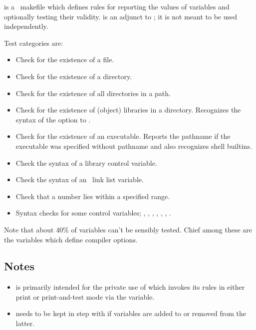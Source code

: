  is a \gnu\ makefile which defines rules for reporting the
values of  variables and optionally testing their validity.
 is an adjunct to ; it is not meant to be used
independently.

Test categories are:

\begin{itemize}
\item
   Check for the existence of a file.

\item
   Check for the existence of a directory.

\item
   Check for the existence of all directories in a path.

\item
   Check for the existence of (object) libraries in a directory.  Recognizes
   the syntax of the  option to .

\item
   Check for the existence of an executable.  Reports the pathname if the
   executable was specified without pathname and also recognizes shell
   builtins.

\item
   Check the syntax of a library control variable.

\item
   Check the syntax of an \aipspp\ link list variable.

\item
   Check that a number lies within a specified range.

\item
   Syntax checks for some control variables; , ,
   , , , ,
   .
\end{itemize}

\noindent
Note that about 40\% of  variables can't be sensibly
tested.  Chief among these are the variables which define compiler options.

\subsection*{Notes}
 
\begin{itemize}
\item
    is primarily intended for the private use of
    which invokes its rules in either print or
   print-and-test mode via the  variable.

\item
    needs to be kept in step with  if
   variables are added to or removed from the latter.
\end{itemize}

